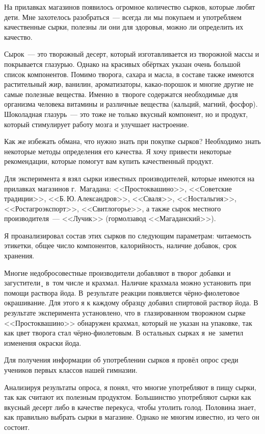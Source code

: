 На прилавках магазинов появилось огромное количество сырков, которые любят дети. Мне захотелось разобраться~--- всегда ли мы покупаем и употребляем качественные сырки, полезны ли они для здоровья, можно ли определить их качество.

Сырок~---  это творожный десерт, который изготавливается из творожной массы и покрывается глазурью. Однако на красивых обёртках указан очень большой список компонентов. Помимо творога, сахара и масла, в составе также имеются растительный жир, ванилин, ароматизаторы, какао-порошок и многие другие не самые полезные вещества. Именно в~твороге содержатся необходимые для организма человека витамины и различные вещества (кальций, магний, фосфор). Шоколадная глазурь~--- это тоже не только вкусный компонент, но и продукт, который стимулирует работу мозга и улучшает настроение.

Как же избежать обмана, что нужно знать при покупке сырков? Необходимо знать некоторые методы определения его качества. Я  хочу привести  некоторые рекомендации, которые помогут вам купить качественный продукт.

Для эксперимента я взял сырки известных производителей, которые имеются на прилавках магазинов г.~Магадана: <<Простоквашино>>, <<Советские традиции>>, <<Б.\,Ю.\,Александров>>, <<Сваля>>, <<Ностальгия>>, <<Ростагроэкспорт>>, <<Свитлогорье>>, а также сырок местного производителя~--- <<Лучик>> (гормолзавод <<Магаданский>>).

Я проанализировал состав этих сырков по следующим параметрам: читаемость этикетки, общее число компонентов, калорийность, наличие добавок, срок хранения.

Многие недобросовестные производители добавляют в творог добавки и загустители¸ в~том числе и крахмал. Наличие крахмала можно установить при помощи раствора йода. В~результате реакции появляется чёрно-фиолетовое окрашивание. Для этого я к каждому образцу добавил спиртовой раствор йода. В результате эксперимента установлено, что в~глазированном творожном сырке <<Простоквашино>> обнаружен крахмал, который не указан на упаковке, так как цвет творога стал чёрно-фиолетовым. В остальных сырках я~не~заметил изменения окраски йода.

Для получения информации об употреблении сырков я провёл опрос среди учеников первых классов нашей гимназии.

Анализируя результаты опроса, я понял, что многие употребляют в пищу сырки, так как считают их полезным продуктом. Большинство употребляют сырки как вкусный десерт либо в качестве перекуса, чтобы утолить голод. Половина знает, как правильно выбрать сырки в магазине. Однако не многим известно, из чего он состоит.

